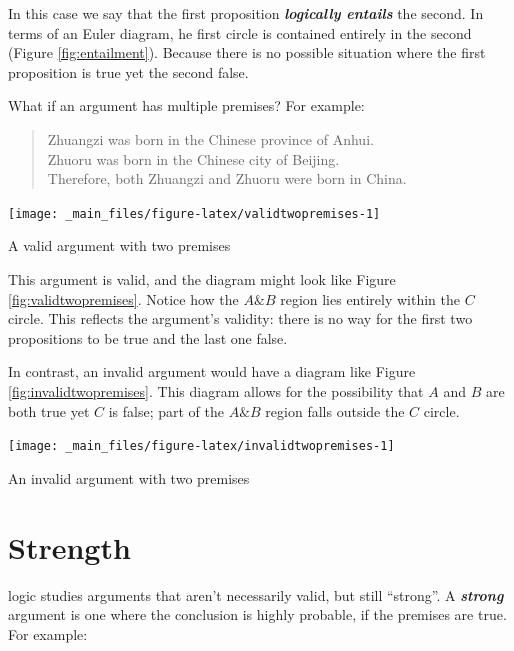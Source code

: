 \documentclass[justified]{tufte-book}
\renewcommand{\wedge}{\mathbin{\&}}
\newenvironment{argument}{\begin{quote}\normalsize}{\end{quote}}
\begin{document}
In this case we say that the first proposition \textbf{\emph{logically entails}} the second. In terms of an Euler diagram, he first circle is contained entirely in the second (Figure \ref{fig:entailment}). Because there is no possible situation where the first proposition is true yet the second false.

What if an argument has multiple premises? For example:

\begin{argument}
Zhuangzi was born in the Chinese province of Anhui.\\
Zhuoru was born in the Chinese city of Beijing.\\
Therefore, both Zhuangzi and Zhuoru were born in China.
\end{argument}

\begin{marginfigure}
\texttt{[image: \_main\_files/figure-latex/validtwopremises-1]} \caption[A valid argument with two premises]{A valid argument with two premises}\label{fig:validtwopremises}
\end{marginfigure}

This argument is valid, and the diagram might look like Figure \ref{fig:validtwopremises}. Notice how the \(A \wedge B\) region lies entirely within the \(C\) circle. This reflects the argument's validity: there is no way for the first two propositions to be true and the last one false.

In contrast, an invalid argument would have a diagram like Figure \ref{fig:invalidtwopremises}. This diagram allows for the possibility that \(A\) and \(B\) are both true yet \(C\) is false; part of the \(A \wedge B\) region falls outside the \(C\) circle.

\begin{marginfigure}
\texttt{[image: \_main\_files/figure-latex/invalidtwopremises-1]} \caption[An invalid argument with two premises]{An invalid argument with two premises}\label{fig:invalidtwopremises}
\end{marginfigure}

\hypertarget{strength}{%
\section{Strength}\label{strength}}

 logic studies arguments that aren't necessarily valid, but still ``strong''. A \textbf{\emph{strong}} argument is one where the conclusion is highly probable, if the premises are true. For example:
\end{document}
